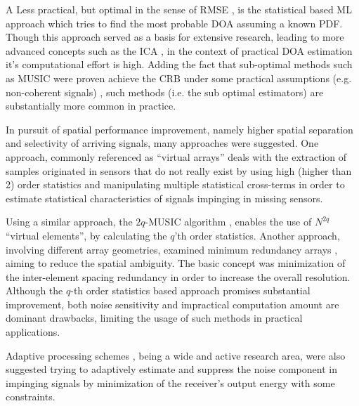 \par A Less practical, but optimal in the sense of RMSE \cite{krim1996two}, is the statistical based ML approach which tries to find the most probable DOA assuming a known PDF.
Though this approach served as a basis for extensive research, leading to more advanced concepts such as the ICA \cite{hyvarinen1999survey}, in the context of practical DOA estimation it's computational effort is high.
Adding the fact that sub-optimal methods such as MUSIC were proven achieve the CRB under some practical assumptions (e.g. non-coherent signals) \cite{stoica1989music}, such methods (i.e. the sub optimal estimators) are substantially more common in practice. 
\par In pursuit of spatial performance improvement, namely higher spatial separation and selectivity of arriving signals, many approaches were suggested.  
One approach, commonly referenced as ``virtual arrays'' \cite{pal2010nested,chevalier2005virtual,dogan1995applications} deals with the extraction of samples originated in sensors that do not really exist by using high (higher than 2) order statistics and manipulating multiple statistical cross-terms in order to estimate statistical characteristics of signals impinging in missing sensors.
\par Using a similar approach, the $2q$-MUSIC algorithm \cite{chevalier2006high}, enables the use of $N^{2q}$ ``virtual elements'', by calculating the $q$'th order statistics.
Another approach, involving different array geometries, examined minimum redundancy arrays \cite{moffet1968minimum,pillai1985new,pillai1987statistical,Kupershtein2013}, aiming to reduce the spatial ambiguity. The basic concept was minimization of the inter-element spacing redundancy in order to increase the overall resolution.
Although the $q$-th order statistics based approach promises substantial improvement, both noise sensitivity and impractical computation amount are dominant drawbacks, limiting the usage of such methods in practical applications.   
\par Adaptive processing schemes \cite{frost1972algorithm,manolakis2000statistical}, being a wide and active research area, were also suggested trying to adaptively estimate and suppress the noise component in impinging signals by minimization of the receiver's output energy with some constraints.

